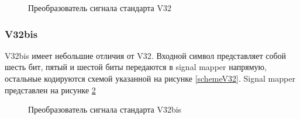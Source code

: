 \documentclass[a4paper,12pt]{article}
\begin{document}
\begin{figure}
	\caption{Преобразователь сигнала стандарта V32}
	\label{mapperV32}
\end{figure}

\subsubsection{V32bis}
V32bis имеет небольшие отличия от V32. Входной символ представляет собой шесть бит, пятый и шестой биты передаются в 
signal mapper напрямую, остальные кодируются схемой указанной на рисунке \ref{schemeV32}. Signal mapper представлен
на рисунке \ref{mapperV32bis}

\begin{figure}
	\caption{Преобразователь сигнала стандарта V32bis}
	\label{mapperV32bis}
\end{figure}
\end{document}

